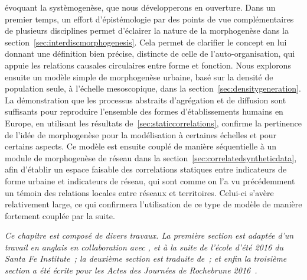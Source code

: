 évoquant la systèmogenèse, que nous développerons en ouverture. Dans un premier temps, un effort d'épistémologie par des points de vue complémentaires de plusieurs disciplines permet d'éclairer la nature de la morphogenèse dans la section~\ref{sec:interdiscmorphogenesis}. Cela permet de clarifier le concept en lui donnant une définition bien précise, distincte de celle de l'auto-organisation, qui appuie les relations causales circulaires entre forme et fonction. Nous explorons ensuite un modèle simple de morphogenèse urbaine, basé sur la densité de population seule, à l'échelle mesoscopique, dans la section~\ref{sec:densitygeneration}. La démonstration que les processus abstraits d'agrégation et de diffusion sont suffisants pour reproduire l'ensemble des formes d'établissements humains en Europe, en utilisant les résultats de~\ref{sec:staticcorrelations}, confirme la pertinence de l'idée de morphogenèse pour la modélisation à certaines échelles et pour certains aspects. Ce modèle est ensuite couplé de manière séquentielle à un module de morphogenèse de réseau dans la section~\ref{sec:correlatedsyntheticdata}, afin d'établir un espace faisable des correlations statiques entre indicateurs de forme urbaine et indicateurs de réseau, qui sont comme on l'a vu précédemment un témoin des relations locales entre réseaux et territoires. Celui-ci s'avère relativement large, ce qui confirmera l'utilisation de ce type de modèle de manière fortement couplée par la suite.




\stars


\textit{Ce chapitre est composé de divers travaux. La première section est adaptée d'un travail en anglais en collaboration avec ,  et  à la suite de l'école d'été 2016 du Santa Fe Institute~\cite{antelope2016interdisciplinary}; la deuxième section est traduite de~\cite{}; et enfin la troisième section a été écrite pour les Actes des Journées de Rochebrune 2016~\cite{raimbault2016generation}.}














